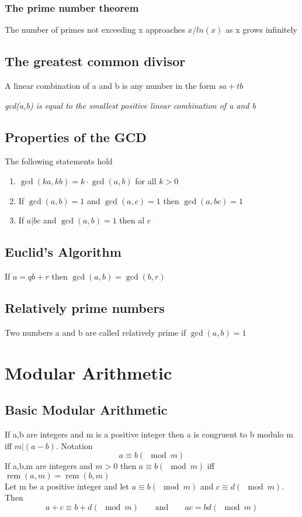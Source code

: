 \documentclass{article}[18pt]
\begin{document}
\subsubsection{The prime number theorem}
The number of primes not exceeding x approaches $x/ln(x)$ as x grows infinitely
\subsection{The greatest common divisor}
A linear combination of a and b is any number in the form $sa+tb$
\begin{center}
	\textit{gcd(a,b) is equal to the smallest positive linear combination of a and b}
\end{center}
\subsection{Properties of the GCD}
The following statements hold
\begin{enumerate}
	\item \(\operatorname{gcd}(k a, k b)=k \cdot \operatorname{gcd}(a, b)\) for all \(k>0\)
	\item If \(\operatorname{gcd}(a, b)=1\) and \(\operatorname{gcd}(a, c)=1\) then \(\operatorname{gcd}(a, b c)=1\)
	\item If \(a | b c\) and \(\operatorname{gcd}(a, b)=1\) then al \(c\)
\end{enumerate}
\subsection{Euclid's Algorithm}
If $a=qb+r$ then $\operatorname{gcd}(a,b)=\operatorname{gcd}(b,r)$
\subsection{Relatively prime numbers}
Two numbers a and b are called relatively prime if $\operatorname{gcd}(a,b)=1$
\section{Modular Arithmetic}
\subsection{Basic Modular Arithmetic}
If a,b are integers and m is a positive integer then a is congruent to b modulo m iff $m|(a-b)$. Notation
$$a\equiv b(\mod m)$$
If a,b,m are integers and $m>0$ then $a\equiv b (\mod m)$ iff $\operatorname{rem}(a,m)=\operatorname{rem}(b,m)$\\
Let m be a positive integer and let $a\equiv b(\mod m)$ and $c\equiv d(\mod m)$. Then
$$a+c\equiv b+d (\mod m) \qquad \text{and} \qquad ac=bd(\mod m)$$
\end{document}
